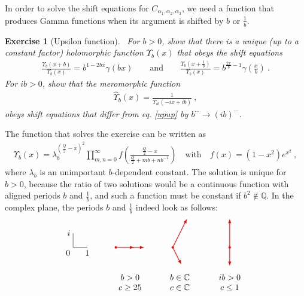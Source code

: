 \documentclass[12pt, a4paper]{article}
\theoremstyle{break}
\newtheorem{exo}{Exercise}[section]
\begin{document}
In order to solve the shift equations for $C_{\alpha_1,\alpha_2,\alpha_3}$, we need a function that produces Gamma functions when its argument is shifted by $b$ or $\frac{1}{b}$. 

\begin{exo}[Upsilon function]
~\label{exo:upsilon}
 For $b>0$, show that there is a unique (up to a constant factor) holomorphic function $\Upsilon_b(x)$ that obeys the shift equations
 \begin{align}
  \frac{\Upsilon_b(x+b)}{\Upsilon_b(x)} = b^{1-2bx} \gamma(bx)\qquad \text{and} \qquad \frac{\Upsilon_b(x+\frac{1}{b})}{\Upsilon_b(x)} = b^{\frac{2x}{b}-1} \gamma(\tfrac{x}{b})\ .
\label{upup}
\end{align}
For $ib>0$, show that the meromorphic function 
\begin{align}
 \hat{\Upsilon}_b(x) = \frac{1}{\Upsilon_{ib}(-ix+ib)}\ ,
\end{align}
obeys shift equations that differ from eq. \eqref{upup} by $b^{\cdots} \to (ib)^{\cdots}$.
\end{exo}
The function that solves the exercise can be written as 
\begin{align}
 \Upsilon_b(x) = \lambda_b^{(\frac{Q}{2}-x)^2}\prod_{m,n=0}^\infty f\left(\frac{\frac{Q}{2}-x}{\frac{Q}{2}+mb+nb^{-1}}\right) \quad \text{with} \quad f(x)=(1-x^2)e^{x^2}\ ,
 \label{eq:up}
\end{align}
where $\lambda_b$ is an unimportant $b$-dependent constant.
The solution is unique for $b>0$, because the ratio of two solutions would be a continuous function with aligned periods $b$ and $\frac{1}{b}$, and such a function must be constant if $b^2\notin \mathbb{Q}$. In the complex plane, the periods $b$ and $\frac{1}{b}$ indeed look as follows:
\begin{equation}
 \begin{tikzpicture}[baseline=(current  bounding  box.center), scale = .6]
\draw (0, 2) node[left]{$i$} -- (0, 1) node[below left] {$0$} -- (1, 1) node[below] {$1$};
\draw [red, thick, latex-latex] (11,3) -- (11,1) node[fill, circle, minimum size = 1mm, inner sep = 0]{} -- (11,-.3);
\draw [red, thick, latex-latex] (8,3) -- (7,1) node[fill, circle, minimum size = 1mm, inner sep = 0]{}-- (7.6,-.2);
\draw [red, thick, latex-latex] (5,1) -- (3,1) node[fill, circle, minimum size = 1mm, inner sep = 0]{} -- (4.3,1) ;
\node at (4, -1.5){$\begin{array}{c} b>0 \\ c\geq 25 \end{array}$};
\node at (7.5, -1.5){$\begin{array}{c} b\in \mathbb{C} \\ c\in\mathbb{C} \end{array}$};
\node at (11, -1.5){$\begin{array}{c} ib>0 \\ c\leq 1 \end{array}$};
 \end{tikzpicture}
\end{equation}
\end{document}
